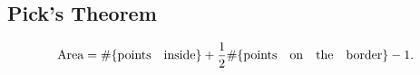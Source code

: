 \subsection{Pick's Theorem}
$${\rm Area} = \#\{{\rm points\quad inside}\}
+\frac{1}{2}
\#\{{\rm points\quad  on\quad  the\quad  border}\} - 1.$$